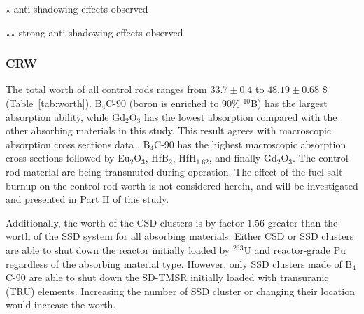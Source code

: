 \begin{sidewaystable}
	\begin{tablenotes}
		\tiny
		\item  $\star$  anti-shadowing effects observed
		\item  $\star$$\star$ strong anti-shadowing effects observed
	\end{tablenotes}
	\label{tab:worth}
\end{sidewaystable}

\subsubsection{CRW} \label{CR_worth}

The total worth of all control rods ranges from $33.7\pm0.4$ to $48.19\pm0.68$ 
\$ (Table~\ref{tab:worth}). B$_4$C-90 (boron is enriched to 90\% $^{10}$B) 
has the largest absorption ability, while Gd$_2$O$_3$ has the lowest 
absorption compared with the other absorbing materials in this study. This 
result agrees with macroscopic absorption cross sections data 
\cite{guo2019optimized}. B$_4$C-90 has the highest macroscopic 
absorption cross sections followed by Eu$_2$O$_3$, HfB$_2$, HfH$_{1.62}$, and 
finally Gd$_2$O$_3$. The control rod material are being transmuted during 
operation. The effect of the fuel salt burnup on the control rod worth is not 
considered herein, and will be investigated and presented in Part II of this 
study.

Additionally, the worth of the CSD clusters is by factor $1.56$ greater than 
the worth of the SSD system for all absorbing materials. Either CSD or SSD 
clusters are able to shut down the reactor initially loaded by 
$^{233}$U and reactor-grade Pu regardless of the absorbing material type. 
However, only SSD clusters made of B$_4$C-90 are able to shut down the SD-TMSR 
initially loaded with transuranic (TRU) elements. Increasing the number of SSD 
cluster or changing their location would increase the worth.

